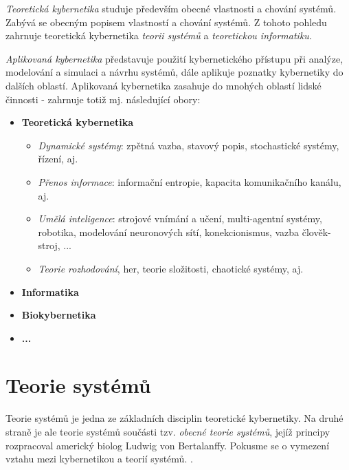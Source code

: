       \emph{Teoretická kybernetika} studuje především obecné vlastnosti a chování systémů. Zabývá 
      se obecným popisem vlastností a chování systémů. Z tohoto pohledu zahrnuje teoretická 
      kybernetika \emph{teorii systémů} a \emph{teoretickou informatiku}.
      
      \emph{Aplikovaná kybernetika} představuje použití kybernetického přístupu při analýze, 
      modelování a simulaci a návrhu systémů, dále aplikuje poznatky kybernetiky do dalších 
      oblastí. Aplikovaná kybernetika zasahuje do mnohých oblastí lidské činnosti - zahrnuje totiž 
      mj. následující obory:
      
      \begin{itemize}\addtolength{\itemsep}{-0.1\baselineskip}
        \item \textbf{Teoretická kybernetika}
              \begin{itemize}\addtolength{\itemsep}{-0.1\baselineskip}
                \item \emph{Dynamické systémy}: zpětná vazba, stavový popis, stochastické systémy,
                      řízení, aj.
                \item \emph{Přenos informace}: informační entropie, kapacita komunikačního kanálu, 
                      aj. 
                \item \emph{Umělá inteligence}: strojové vnímání a učení, multi-agentní systémy, 
                      robotika, modelování neuronových sítí, konekcionismus, vazba člověk-stroj, ...
                \item \emph{Teorie rozhodování}, her, teorie složitosti, chaotické systémy, aj.
              \end{itemize}
        \item \textbf{Informatika}
        \item \textbf{Biokybernetika}
        \item \textbf{...}
      \end{itemize}
      
  \section{Teorie systémů}
     Teorie systémů je jedna ze základních disciplin teoretické kybernetiky. Na druhé straně je ale 
     teorie systémů součásti tzv. \emph{obecné teorie systémů}, jejíž principy rozpracoval americký 
     biolog Ludwig von Bertalanffy. Pokusme se o vymezení vztahu mezi kybernetikou a teorií systémů.
     \cite[s.~11]{Svarc1986}.
     
